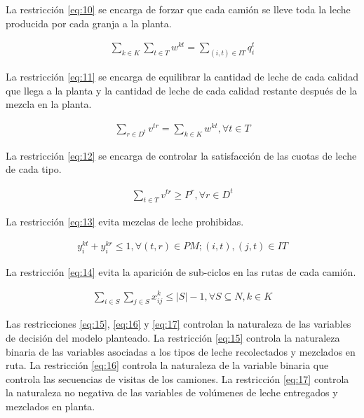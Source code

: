      La restricción \ref{eq:10} se encarga de forzar que cada camión se lleve toda la leche producida por cada granja a la planta.

        \begin{align} \label{eq:10}
            \sum_{k\in K} \sum_{t\in T} w^{k t} = \sum_{(i, t) \in IT} {q_i^{t}}
        \end{align}


     La restricción \ref{eq:11} se encarga de equilibrar la cantidad de leche de cada calidad que
llega a la planta y la cantidad de leche de cada calidad restante después de la mezcla
en la planta.

        \begin{align} \label{eq:11}
            \sum_{r\in D^t} v^ {t r} = \sum_{k\in K} w^{k t} , \forall t \in T
        \end{align}

     La restricción \ref{eq:12} se encarga de controlar la satisfacción de las cuotas de leche de
cada tipo.

        \begin{align} \label{eq:12}
            \sum_{t\in T} v^{t r} \geq P^r , \forall r \in D^t
        \end{align}


     La restricción \ref{eq:13} evita mezclas de leche prohibidas.

        \begin{align} \label{eq:13}
            y_i^{k t} + y_i^{k r} \leq 1, \forall (t, r) \in PM; (i, t), (j, t) \in IT
        \end{align}


     La restricción \ref{eq:14} evita la aparición de sub-ciclos en las rutas de cada camión.

        \begin{align} \label{eq:14}
            \sum_{i \in S}\sum_{j \in S} x_{i j}^{k} \leq |S| -1 , \forall S \subseteq N, k \in K
        \end{align}


     Las restricciones \ref{eq:15}, \ref{eq:16} y \ref{eq:17} controlan la naturaleza de las variables de decisión del modelo planteado. La restricción \ref{eq:15} controla la naturaleza binaria de las variables asociadas a los tipos de leche recolectados y mezclados en ruta. La restricción \ref{eq:16} controla la naturaleza de la variable binaria que controla las secuencias de visitas de los camiones. La restricción \ref{eq:17} controla la naturaleza no negativa de las variables de volúmenes de leche entregados y mezclados en planta.

